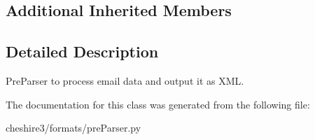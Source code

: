 \subsection*{Additional Inherited Members}


\subsection{Detailed Description}
\begin{DoxyVerb}PreParser to process email data and output it as XML.\end{DoxyVerb}
 

The documentation for this class was generated from the following file\-:\begin{DoxyCompactItemize}
\item 
cheshire3/formats/pre\-Parser.\-py\end{DoxyCompactItemize}
